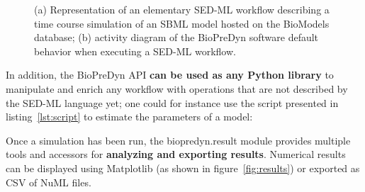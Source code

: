 \documentclass[17pt,portrait,a1,usenames,dvipsnames,plainboxedsections]{sciposter}
\begin{document}
\begin{multicols}{2}
\begin{figure}
\begin{minipage}[c]{0.3\textwidth}
\end{minipage}
\caption{(a) Representation of an elementary SED-ML workflow describing a time
course simulation of an SBML model hosted on the BioModels database; (b)
activity diagram of the BioPreDyn software default behavior when executing a
SED-ML workflow.}
\label{fig:sedml}
\end{figure}

In addition, the BioPreDyn API {\bf can be used as any Python library} to
manipulate and enrich any workflow with operations that are not described by
the SED-ML language yet; one could for instance use the script presented in
listing~\ref{lst:script} to estimate the parameters of a model:


\label{lst:script}

Once a simulation has been run, the biopredyn.result module provides multiple
tools and accessors for {\bf analyzing and exporting results}. Numerical results
can be displayed using Matplotlib\cite{Hunter2007} (as shown in
figure~\ref{fig:results}) or exported as CSV of NuML files.


\end{multicols}
\end{document}
